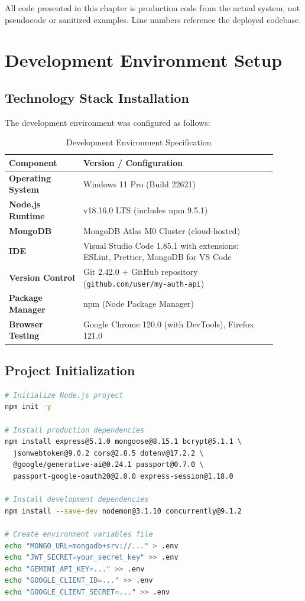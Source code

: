 \documentclass[12pt, a4paper]{report}
\begin{document}
All code presented in this chapter is production code from the actual system, not pseudocode or sanitized examples. Line numbers reference the deployed codebase.

\section{Development Environment Setup}

\subsection{Technology Stack Installation}

The development environment was configured as follows:

\begin{table}[H]
\centering
\caption{Development Environment Specification}
\label{tab:dev_env}
\begin{tabular}{@{}p{0.25\linewidth}p{0.65\linewidth}@{}}
\toprule
\textbf{Component} & \textbf{Version / Configuration} \\
\midrule
\textbf{Operating System} & Windows 11 Pro (Build 22621) \\
\textbf{Node.js Runtime} & v18.16.0 LTS (includes npm 9.5.1) \\
\textbf{MongoDB} & MongoDB Atlas M0 Cluster (cloud-hosted) \\
\textbf{IDE} & Visual Studio Code 1.85.1 with extensions: ESLint, Prettier, MongoDB for VS Code \\
\textbf{Version Control} & Git 2.42.0 + GitHub repository (\texttt{github.com/user/my-auth-api}) \\
\textbf{Package Manager} & npm (Node Package Manager) \\
\textbf{Browser Testing} & Google Chrome 120.0 (with DevTools), Firefox 121.0 \\
\bottomrule
\end{tabular}
\end{table}

\subsection{Project Initialization}

\begin{lstlisting}[language=bash, caption=Project Setup Commands]
# Initialize Node.js project
npm init -y

# Install production dependencies
npm install express@5.1.0 mongoose@8.15.1 bcrypt@5.1.1 \
  jsonwebtoken@9.0.2 cors@2.8.5 dotenv@17.2.2 \
  @google/generative-ai@0.24.1 passport@0.7.0 \
  passport-google-oauth20@2.0.0 express-session@1.18.0

# Install development dependencies
npm install --save-dev nodemon@3.1.10 concurrently@9.1.2

# Create environment variables file
echo "MONGO_URL=mongodb+srv://..." > .env
echo "JWT_SECRET=your_secret_key" >> .env
echo "GEMINI_API_KEY=..." >> .env
echo "GOOGLE_CLIENT_ID=..." >> .env
echo "GOOGLE_CLIENT_SECRET=..." >> .env
\end{lstlisting}
\end{document}
